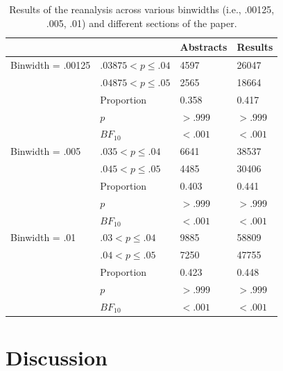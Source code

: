 \documentclass[a5paper]{book}
\begin{document}
\begin{table}[!h]

\caption{\label{tab:caliper-table}Results of the reanalysis across various binwidths (i.e., .00125, .005, .01) and different sections of the paper.}
\centering
\begin{tabular}{llll}
\toprule
 &  & Abstracts & Results\\
\midrule
\rowcolor{gray!6}  Binwidth = .00125 & $.03875 < p \leq .04$ & 4597 & 26047\\
 & $.04875 < p \leq .05$ & 2565 & 18664\\
\rowcolor{gray!6}   & Proportion & 0.358 & 0.417\\
 & $p$ & $>.999$ & \vphantom{2} $>.999$\\
\rowcolor{gray!6}   & $BF_{10}$ & $<.001$ & \vphantom{2} $<.001$\\
\addlinespace
Binwidth = .005 & $.035 < p \leq .04$ & 6641 & 38537\\
\rowcolor{gray!6}   & $.045 < p \leq .05$ & 4485 & 30406\\
 & Proportion & 0.403 & 0.441\\
\rowcolor{gray!6}   & $p$ & $>.999$ & \vphantom{1} $>.999$\\
 & $BF_{10}$ & $<.001$ & \vphantom{1} $<.001$\\
\addlinespace
\rowcolor{gray!6}  Binwidth = .01 & $.03 < p \leq .04$ & 9885 & 58809\\
 & $.04 < p \leq .05$ & 7250 & 47755\\
\rowcolor{gray!6}   & Proportion & 0.423 & 0.448\\
 & $p$ & $>.999$ & $>.999$\\
\rowcolor{gray!6}   & $BF_{10}$ & $<.001$ & $<.001$\\
\bottomrule
\end{tabular}
\end{table}

\section{Discussion}\label{discussion}
\end{document}
